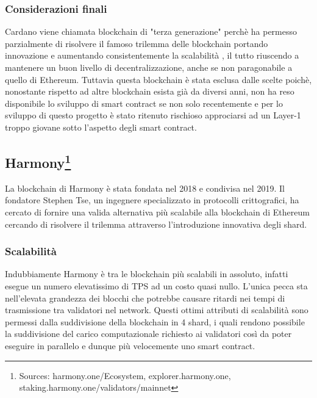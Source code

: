 \documentclass[a4paper, 12pt]{article}
\begin{document}
\subsubsection*{Considerazioni finali}
Cardano viene chiamata blockchain di "terza generazione" perchè ha permesso parzialmente di risolvere il famoso trilemma delle blockchain portando innovazione e aumentando consistentemente la scalabilità  , il tutto riuscendo a mantenere un buon livello di decentralizzazione, anche se non paragonabile a quello di Ethereum. Tuttavia questa blockchain è stata esclusa dalle scelte poichè, nonostante rispetto ad altre blockchain esista già da diversi anni, non ha reso disponibile lo sviluppo di smart contract se non solo recentemente e per lo sviluppo di questo progetto è stato ritenuto rischioso approciarsi ad un Layer-1 troppo giovane sotto l'aspetto degli smart contract.


\newpage
\subsection*{Harmony\footnote{Sources: harmony.one/Ecosystem, explorer.harmony.one, staking.harmony.one/validators/mainnet}}
La blockchain di Harmony è stata fondata nel 2018 e condivisa nel 2019. Il fondatore Stephen Tse, un ingegnere specializzato in protocolli crittografici, ha cercato di fornire una valida alternativa più scalabile alla blockchain di Ethereum cercando di risolvere il trilemma attraverso l'introduzione innovativa degli shard.
\subsubsection*{Scalabilità}
Indubbiamente Harmony è tra le blockchain più scalabili in assoluto, infatti esegue un numero elevatissimo di TPS ad un costo quasi nullo. L'unica pecca sta nell'elevata grandezza dei blocchi che potrebbe causare ritardi nei tempi di trasmissione tra validatori nel network. Questi ottimi attributi di scalabilità sono permessi dalla suddivisione della blockchain in 4 shard, i quali rendono possibile la suddivisione del carico computazionale richiesto ai validatori così da poter eseguire in parallelo e dunque più velocemente uno smart contract.
\end{document}
